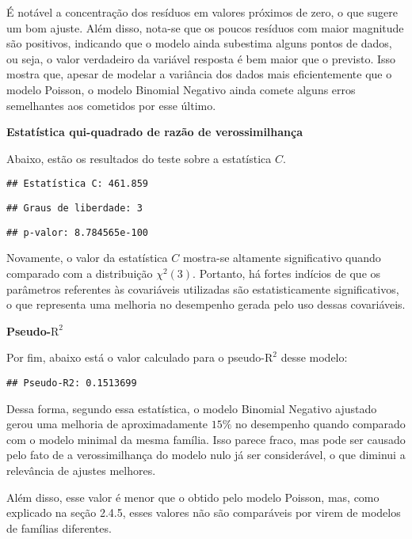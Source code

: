\documentclass[
]{article}
\begin{document}
É notável a concentração dos resíduos em valores próximos de zero, o que
sugere um bom ajuste. Além disso, nota-se que os poucos resíduos com
maior magnitude são positivos, indicando que o modelo ainda subestima
alguns pontos de dados, ou seja, o valor verdadeiro da variável resposta
é bem maior que o previsto. Isso mostra que, apesar de modelar a
variância dos dados mais eficientemente que o modelo Poisson, o modelo
Binomial Negativo ainda comete alguns erros semelhantes aos cometidos
por esse último.

\textbf{Estatística qui-quadrado de razão de verossimilhança}

Abaixo, estão os resultados do teste sobre a estatística \(C\).

\begin{verbatim}
## Estatística C: 461.859
\end{verbatim}

\begin{verbatim}
## Graus de liberdade: 3
\end{verbatim}

\begin{verbatim}
## p-valor: 8.784565e-100
\end{verbatim}

Novamente, o valor da estatística \(C\) mostra-se altamente
significativo quando comparado com a distribuição \(\chi^2(3)\).
Portanto, há fortes indícios de que os parâmetros referentes às
covariáveis utilizadas são estatisticamente significativos, o que
representa uma melhoria no desempenho gerada pelo uso dessas
covariáveis.

\textbf{Pseudo-\(\text{R}^2\)}

Por fim, abaixo está o valor calculado para o pseudo-\(\text{R}^2\)
desse modelo:

\begin{verbatim}
## Pseudo-R2: 0.1513699
\end{verbatim}

Dessa forma, segundo essa estatística, o modelo Binomial Negativo
ajustado gerou uma melhoria de aproximadamente \(15\%\) no desempenho
quando comparado com o modelo minimal da mesma família. Isso parece
fraco, mas pode ser causado pelo fato de a verossimilhança do modelo
nulo já ser considerável, o que diminui a relevância de ajustes
melhores.

Além disso, esse valor é menor que o obtido pelo modelo Poisson, mas,
como explicado na seção 2.4.5, esses valores não são comparáveis por
virem de modelos de famílias diferentes.
\end{document}
